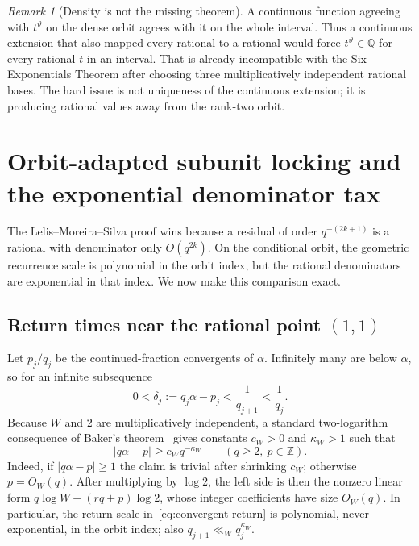 \documentclass[11pt]{article}
\theoremstyle{definition}
\theoremstyle{remark}
\newtheorem{remark}[theorem]{Remark}
\newcommand{\Q}{\mathbb Q}
\newcommand{\Z}{\mathbb Z}
\begin{document}
\begin{remark}[Density is not the missing theorem]
A continuous function agreeing with $t^\vartheta$ on the dense orbit agrees with it on the
whole interval.  Thus a continuous extension that also mapped every rational to a rational
would force $t^\vartheta\in\Q$ for every rational $t$ in an interval.  That is already
incompatible with the Six Exponentials Theorem after choosing three multiplicatively
independent rational bases.  The hard issue is not uniqueness of the continuous extension;
it is producing rational values away from the rank-two orbit.
\end{remark}

\section{Orbit-adapted subunit locking and the exponential denominator tax}
\label{sec:contact}

The Lelis--Moreira--Silva proof wins because a residual of order $q^{-(2k+1)}$ is a rational
with denominator only $O(q^{2k})$.  On the conditional orbit, the geometric recurrence scale
is polynomial in the orbit index, but the rational denominators are exponential in that
index.  We now make this comparison exact.

\subsection{Return times near the rational point $(1,1)$}

Let $p_j/q_j$ be the continued-fraction convergents of $\alpha$.  Infinitely many are below
$\alpha$, so for an infinite subsequence
\begin{equation}
 0<\delta_j:=q_j\alpha-p_j<\frac1{q_{j+1}}<\frac1{q_j}.
 \label{eq:convergent-return}
\end{equation}
Because $W$ and $2$ are multiplicatively independent, a standard two-logarithm consequence
of Baker's theorem~\cite{Baker1975} gives constants $c_W>0$ and $\kappa_W>1$ such that
\begin{equation}
 |q\alpha-p|\ge c_W q^{-\kappa_W}
 \qquad(q\ge2,\ p\in\Z).
 \label{eq:baker-return-lower}
\end{equation}
Indeed, if $|q\alpha-p|\ge1$ the claim is trivial after shrinking $c_W$; otherwise
$p=O_W(q)$.  After multiplying by $\log2$, the left side is then the nonzero linear
form $q\log W-(rq+p)\log2$, whose integer coefficients have size $O_W(q)$.  In particular,
the return scale in~\eqref{eq:convergent-return} is polynomial, never exponential, in the
orbit index; also $q_{j+1}\ll_W q_j^{\kappa_W}$.
\end{document}
